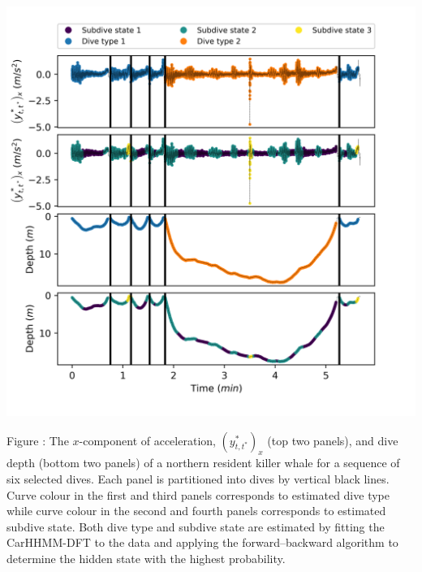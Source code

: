 \documentclass{article}
\begin{document}
        \begin{center}
        \includegraphics[width=6in]{../Plots/2019/20190902-182840-CATs_OB_1_0_267_CarHHMM2_decoded_dives.png}
        \end{center}
        
        \noindent Figure : The $x$-component of acceleration, $(y^*_{t,t^*})_x$ (top two panels), and dive depth (bottom two panels) of a northern resident killer whale for a sequence of six selected dives. Each panel is partitioned into dives by vertical black lines. Curve colour in the first and third panels corresponds to estimated dive type while curve colour in the second and fourth panels corresponds to estimated subdive state. Both dive type and subdive state are estimated by fitting the CarHHMM-DFT to the data and applying the forward--backward algorithm to determine the hidden state with the highest probability.
        \addtocounter{fignum}{1}
        
\end{document}
